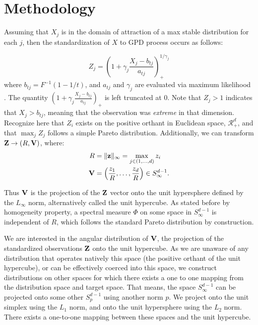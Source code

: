 \section{Methodology}
Assuming that $X_j$ is in the domain of attraction of a max stable distribution
  for each $j$, then the standardization of $X$ to GPD process occurs as follows:

\begin{equation}
Z_{j} = \left(1 + \gamma_j\frac{X_{j} - b_{tj}}{a_{tj}}\right)_{+}^{1/\gamma_j}
\end{equation}
where $b_{tj} = F^{-1}(1-1/t)$, and $a_{tj}$ and $\gamma_{j}$ are evaluated via
  maximum likelihood .  The quantity
  $\left(1 + \gamma_j\frac{X_{j} - b_{tj}}{a_{tj}}\right)_+$ is left truncated
  at 0.  Note that $Z_j > 1$ indicates that $X_{j} > b_{tj}$, meaning that the
  observation was \emph{extreme} in that dimension.  Recognize here that $Z_i$
  exists on the positive orthant in Euclidean space, $\mathcal{R}_+^d$, and
  that $\max_jZ_j$ follows a simple Pareto distribution.  Additionally, we can
  transform ${\bf Z} \rightarrow (R, {\bf V})$, where:
\begin{equation}
  \begin{aligned}
    R &= \lVert {\bf z} \rVert_{\infty} = \max_{j \in (1,\ldots,d)} z_i\\
    {\bf V} &= \left(\frac{z_1}{R},\ldots,\frac{z_d}{R}\right) \in S_{\infty}^{d-1}.\\
  \end{aligned}
\end{equation}

Thus ${\bf V}$ is the projection of the ${\bf Z}$ vector onto the unit
  hypersphere defined by the $L_{\infty}$ norm, alternatively called the unit
  hypercube.  As stated before by homogeneity property, a spectral measure $\Phi$
  on some space in $S_{\infty}^{d-1}$ is independent of $R$, which follows
  the standard Pareto distribution by construction.

We are interested in the angular distribution of ${\bf V}$, the projection of
  the standardized observations ${\bf Z}$ onto the unit hypercube.  As we are
  unaware of any distribution that operates natively this space (the positive
  orthant of the unit hypercube), or can be effectively coerced into this space,
  we construct distributions on other spaces for which there exists a one to
  one mapping from the distribution space and target space.  That means,
  the space $S_{\infty}^{d-1}$ can be projected onto some other $S_p^{d-1}$
  using another norm $p$.  We project onto the unit simplex using the $L_1$
  norm, and onto the unit hypersphere using the $L_2$ norm.  There exists a
  one-to-one mapping between these spaces and the unit hypercube.

